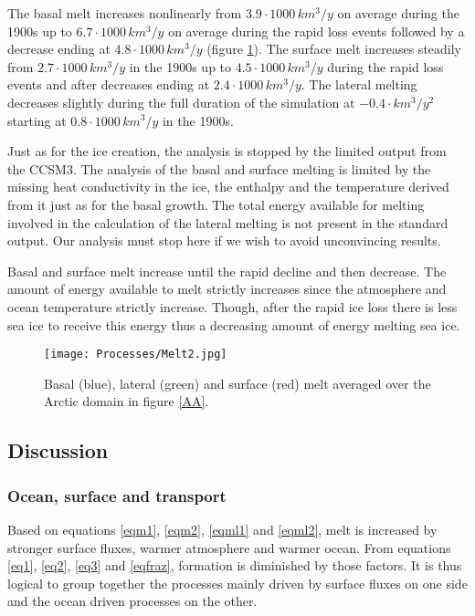 The basal melt increases nonlinearly from $3.9 \cdot 1000 \, km^3/y$ on average during the 1900s up to $6.7 \cdot 1000 \, km^3/y$ on average during the rapid loss events followed by a decrease ending at $4.8 \cdot 1000 \, km^3/y$ (figure \ref{melt}). The surface melt increases steadily from $2.7 \cdot 1000 \, km^3/y$ in the 1900s up to $4.5 \cdot 1000 \, km^3/y$ during the rapid loss events and after decreases ending at $2.4 \cdot 1000 \, km^3/y$. The lateral melting decreases slightly during the full duration of the simulation at  $-0.4 \cdot km^3/y^2$ starting at $0.8 \cdot 1000 \, km^3/y$ in the 1900s. 

Just as for the ice creation, the analysis is stopped by the limited output from the CCSM3. The analysis of the basal and surface melting is limited by the missing heat conductivity in the ice, the enthalpy and the temperature derived from it just as for the basal growth. The total energy available for melting involved in the calculation of the lateral melting is not present in the standard output. Our analysis must stop here if we wish to avoid unconvincing results.

Basal and surface melt increase until the rapid decline and then decrease. The amount of energy available to melt strictly increases since the atmosphere and ocean temperature strictly increase. Though, after the rapid ice loss there is less sea ice to receive this energy thus a decreasing amount of energy melting sea ice. 

\begin{figure}
\center
\noindent\texttt{[image: Processes/Melt2.jpg]}
\caption{Basal (blue), lateral (green) and surface (red) melt averaged over the Arctic domain in figure \ref{AA}.}
\label{melt}
\end{figure}





\subsection{Discussion}\label{discussion}


\subsubsection{Ocean, surface and transport}

Based on equations \ref{eqm1}, \ref{eqm2}, \ref{eqml1} and \ref{eqml2}, melt is increased by stronger surface fluxes, warmer atmosphere and warmer ocean. From equations \ref{eq1}, \ref{eq2}, \ref{eq3} and \ref{eqfraz}, formation is diminished by those factors. It is thus logical to group together the processes mainly driven by surface fluxes on one side and the ocean driven processes on the other. 

